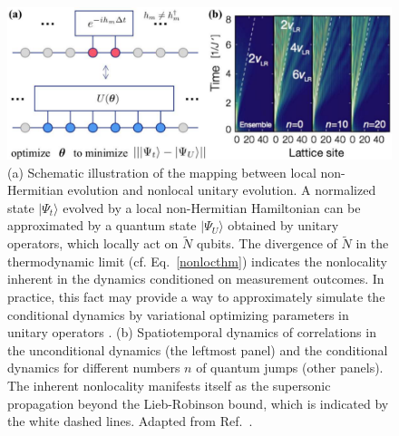 \documentclass{tADP2e}
\theoremstyle{plain}
\theoremstyle{plain}
\theoremstyle{definition}
\begin{document}
\begin{figure}[t]
\begin{center}
\includegraphics[width=13.5cm]{./Figures/fig_4_nonloc.pdf}
\end{center}
\caption{(a)  Schematic  illustration of the mapping between local non-Hermitian  evolution and nonlocal unitary evolution. A normalized state $|\Psi_t\rangle$ evolved by a local non-Hermitian Hamiltonian can be approximated by a quantum state $|\Psi_U\rangle$ obtained by unitary operators, which locally act on $\tilde{N}$ qubits. The divergence of $\tilde{N}$ in the thermodynamic limit (cf. Eq.~\eqref{nonlocthm}) indicates the  nonlocality inherent in the dynamics conditioned on measurement outcomes. In practice, this fact may provide a way to approximately simulate the conditional dynamics by variational optimizing parameters in unitary operators \cite{Moll_2018}. (b) Spatiotemporal dynamics of correlations in the unconditional dynamics (the  leftmost panel) and the conditional dynamics for different numbers $n$ of quantum jumps (other panels). The inherent nonlocality manifests itself as the  supersonic propagation beyond the Lieb-Robinson bound, which is indicated by the white dashed lines.  
 Adapted from Ref.~\cite{YA18}.
 }
\label{fig:4nonloc}
\end{figure}
\end{document}
